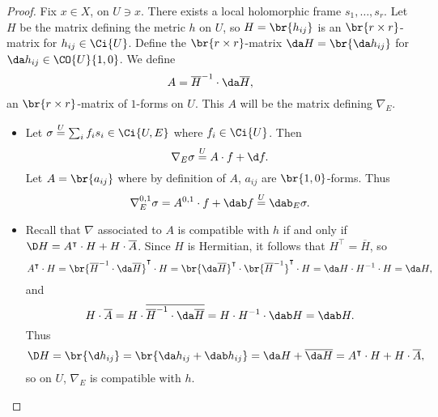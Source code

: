 \begin{proof}
Fix $ x \in X $, on $ U \ni x $. There exists a local holomorphic frame $ s_1, \dots, s_r $. Let $ H $ be the matrix defining the metric $ h $ on $ U $, so $ H = \br{h_{ij}} $ is an $ \br{r \times r} $-matrix for $ h_{ij} \in \Ci{U} $. Define the $ \br{r \times r} $-matrix $ \da H = \br{\da h_{ij}} $ for $ \da h_{ij} \in \CO{U}{1, 0} $. We define
$$ A = \overline{H}^{-1} \cdot \da\overline{H}, $$
an $ \br{r \times r} $-matrix of $ 1 $-forms on $ U $. This $ A $ will be the matrix defining $ \nabla_E $.
\begin{itemize}
\item Let $ \sigma \overset{U}{=} \sum_i f_is_i \in \Ci{U, E} $ where $ f_i \in \Ci{U} $. Then
$$ \nabla_E\sigma \overset{U}{=} A \cdot f + \d f. $$
Let $ A = \br{a_{ij}} $ where by definition of $ A $, $ a_{ij} $ are $ \br{1, 0} $-forms. Thus
$$ \nabla_E^{0, 1}\sigma = A^{0, 1} \cdot f + \dab f \overset{U}{=} \dab_E\sigma. $$

\pagebreak

\item Recall that $ \nabla $ associated to $ A $ is compatible with $ h $ if and only if $ \D H = A^\intercal \cdot H + H \cdot \overline{A} $. Since $ H $ is Hermitian, it follows that $ H^\intercal = \overline{H} $, so
$$ A^\intercal \cdot H = \br{\overline{H}^{-1} \cdot \da\overline{H}}^\intercal \cdot H = \br{\da\overline{H}}^\intercal \cdot \br{\overline{H}^{-1}}^\intercal \cdot H = \da H \cdot H^{-1} \cdot H = \da H, $$
and
$$ H \cdot \overline{A} = H \cdot \overline{\overline{H}^{-1} \cdot \da\overline{H}} = H \cdot H^{-1} \cdot \dab H = \dab H. $$
Thus
$$ \D H = \br{\d h_{ij}} = \br{\da h_{ij} + \dab h_{ij}} = \da H + \overline{\da H} = A^\intercal \cdot H + H \cdot \overline{A}, $$
so on $ U $, $ \nabla_E $ is compatible with $ h $.



\end{itemize}
\end{proof}
